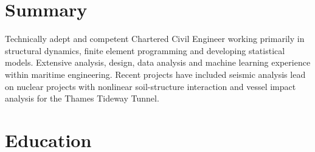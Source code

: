 \documentclass[a4paper]{twentysecondcv} %
\begin{document}
\makeprofile %

\section{Summary}

Technically adept and competent Chartered Civil Engineer working primarily in structural dynamics, finite element programming and developing statistical models. 
Extensive analysis, design, data analysis and machine learning experience within maritime engineering. Recent projects have included seismic analysis lead on nuclear projects with nonlinear soil-structure interaction and vessel impact analysis for the Thames Tideway Tunnel. 

\section{Education}
\end{document}
